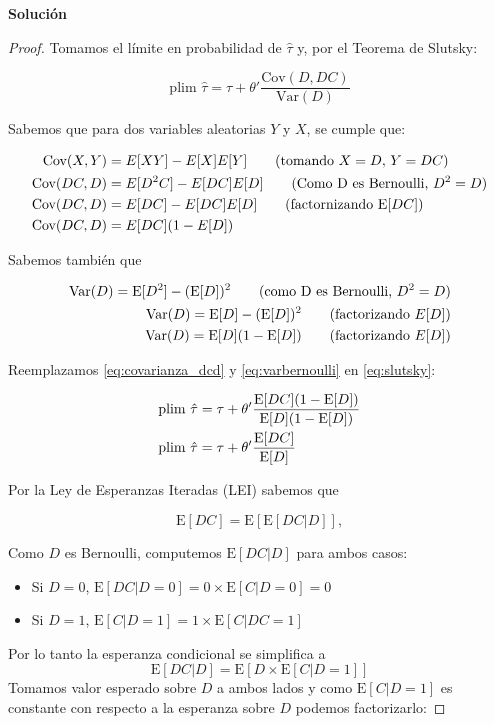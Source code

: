 \documentclass[a4paper, answers, addpoints, 11pt]{exam}
\newenvironment{solucion}{%
  \begin{mdframed}[
    backgroundcolor=blue!5,    %
    linecolor=blue!50,          %
    linewidth=2pt,              %
    leftmargin=10pt,            %
    rightmargin=8pt,           %
    topline=true,              %
    bottomline=true,            %
    roundcorner=10pt,           %
    innerleftmargin=10pt,       %
    innerrightmargin=10pt,      %
    innerbottommargin=10pt,     %
    innertopmargin=10pt         %
  ]%
  \begin{tcolorbox}[colframe=blue!50!black, colback=blue!50, coltitle=white, sharp corners=all, boxrule=1mm, width=\textwidth, halign=left, valign=center, top=0mm, bottom=0mm, left=0mm, right=0mm] \textbf{Solución} \end{tcolorbox} }{\end{mdframed}}
\newcommand{\E}{\mathrm{E}}
\newcommand{\Var}{\mathrm{Var}}
\begin{document}
\begin{itemize}
\begin{solucion}
\begin{proof}
    Tomamos el límite en probabilidad de $\hat{\tau}$ y, por el Teorema de Slutsky:
    
    \begin{equation}
    \text{plim } \hat{\tau} = \tau + \theta' \frac{\text{Cov}(D, DC)}{\text{Var}(D)} \label{eq:slutsky}
    \end{equation}
    
    Sabemos que para dos variables aleatorias $Y$ y $X$, se cumple que:
    
    \begin{align}
    \text{Cov}(X,Y) &= E[XY] - E[X]E[Y] \qquad (\text{tomando }X=D,\, Y=DC) \notag \\
    \text{Cov}(DC,D) &= E[D^2C] - E[DC]E[D] \qquad (\text{Como D es Bernoulli, } D^2=D) \\
    \text{Cov}(DC,D) &= E[DC] - E[DC]E[D] \qquad (\text{factornizando } \E[DC])  \\
    \text{Cov}(DC,D) &= E[DC](1 - E[D])  \label{eq:covarianza_dcd}
    \end{align}

    Sabemos también que 

    \begin{align}
        \Var(D)=\E[D^2]- (\E[D])^2 \qquad (\text{como D es Bernoulli, } D^2=D ) \notag \\
        \Var(D)=\E[D]- (\E[D])^2 \qquad (\text{factorizando } E[D])  \notag \\
        \Var(D)=\E[D](1- \E[D]) \qquad (\text{factorizando } E[D])  \label{eq:varbernoulli}
    \end{align}
 
    Reemplazamos \ref{eq:covarianza_dcd} y \ref{eq:varbernoulli} en \ref{eq:slutsky}:

    \begin{align}
        \text{plim } \hat{\tau} &= \tau + \theta' \frac{\E[DC](1 - \E[D])}{\E[D](1- \E[D])} \notag  \\
        \text{plim } \hat{\tau} &= \tau + \theta' \frac{\E[DC]}{\E[D]} \label{eq:tau_biased2}
    \end{align}

    Por la Ley de Esperanzas Iteradas (LEI) sabemos que 

    \begin{equation}
        \E[DC] = \E[\E[DC|D]],
    \end{equation}

    Como $D$ es Bernoulli, computemos $\E[DC|D]$ para ambos casos:
    \begin{itemize}
        \item Si $D=0$, $\E[DC|D=0]=0\times\E[C|D=0]=0$
        \item Si $D=1$, $\E[C|D=1] = 1\times \E[C|DC=1]$
    \end{itemize}
    Por lo tanto la esperanza condicional se simplifica a 
    \[
    \E[DC|D]=\E[D\times\E[C|D=1]]
    \]
    Tomamos valor esperado sobre $D$ a ambos lados y como $\E[C|D=1]$ es constante con respecto a la esperanza sobre $D$ podemos factorizarlo:


\end{proof}
\end{solucion}
\end{itemize}
\end{document}
